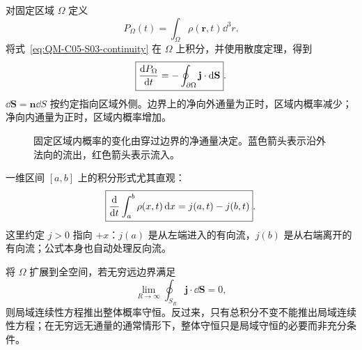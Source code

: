 对固定区域 $\Omega$ 定义
\begin{equation}
  P_\Omega(t)=\int_\Omega\rho(\mathbf r,t)\dd^3r.
  \label{eq:QM-C05-S03-region-probability}
\end{equation}
将式~\eqref{eq:QM-C05-S03-continuity} 在 $\Omega$ 上积分，并使用散度定理，得到
\begin{equation}
  \boxed{
  \frac{\mathop{}\!\mathrm{d} P_\Omega}{\mathop{}\!\mathrm{d} t}
  =-\oint_{\partial\Omega}\mathbf j\cdot\mathop{}\!\mathrm{d}\mathbf S}.
  \label{eq:QM-C05-S03-integral-continuity}
\end{equation}
$\dd\mathbf S=\mathbf n\dd S$ 按约定指向区域外侧。边界上的净向外通量为正时，区域内概率减少；净向内通量为正时，区域内概率增加。

\begin{figure}[htbp]
  \centering
  \caption{固定区域内概率的变化由穿过边界的净通量决定。蓝色箭头表示沿外法向的流出，红色箭头表示流入。}
  \label{fig:QM-C05-S03-boundary-flux}
\end{figure}

一维区间 $[a,b]$ 上的积分形式尤其直观：
\begin{equation}
  \boxed{
  \frac{\mathop{}\!\mathrm{d} }{\mathop{}\!\mathrm{d} t}\int_a^b\rho(x,t)\mathop{}\!\mathrm{d} x
  =j(a,t)-j(b,t)}.
  \label{eq:QM-C05-S03-one-dimensional-balance}
\end{equation}
这里约定 $j>0$ 指向 $+x$：$j(a)$ 是从左端进入的有向流，$j(b)$ 是从右端离开的有向流；公式本身也自动处理反向流。

将 $\Omega$ 扩展到全空间，若无穷远边界满足
\begin{equation}
  \lim_{R\to\infty}\oint_{S_R}\mathbf j\cdot\dd\mathbf S=0,
  \label{eq:QM-C05-S03-no-flux-at-infinity}
\end{equation}
则局域连续性方程推出整体概率守恒。反过来，只有总积分不变不能推出局域连续性方程；在无穷远无通量的通常情形下，整体守恒只是局域守恒的必要而非充分条件。

